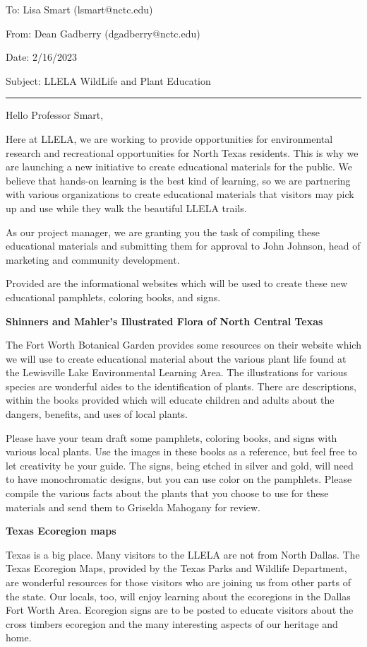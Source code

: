 \documentclass[12pt,a4paper,english]{article}
\begin{document}
\begin{flushleft}

To: Lisa Smart (lsmart@nctc.edu) 

From: Dean Gadberry (dgadberry@nctc.edu)

Date: 2/16/2023

Subject: LLELA WildLife and Plant Education

\hfill \break
\rule{\textwidth}{0.01em} %
\hfill \break
Hello Professor Smart,

Here at LLELA, we are working to provide opportunities for environmental research and recreational opportunities for North Texas residents.
This is why we are launching a new initiative to create educational materials for the public. We believe that hands-on learning is the best kind of learning, so we are partnering with various organizations to create educational materials that visitors may pick up and use while they walk the beautiful LLELA trails. 

As our project manager, we are granting you the task of compiling these educational materials and submitting them for approval to John Johnson, head of marketing and community development. 

Provided are the informational websites which will be used to create these new educational pamphlets, coloring books, and signs. 

\hfill \break
\textbf{Shinners and Mahler's Illustrated Flora of North Central Texas}
\par
The Fort Worth Botanical Garden provides some resources on their website which we will use to create educational material about the various plant life found at the Lewisville Lake Environmental Learning Area.
The illustrations for various species are wonderful aides to the identification of plants. There are descriptions, within the books provided which will educate children and adults about the dangers, benefits, and uses of local plants. 

Please have your team draft some pamphlets, coloring books, and signs with various local plants. Use the images in these books as a reference, but feel free to let creativity be your guide. The signs, being etched in silver and gold, will need to have monochromatic designs, but you can use color on the pamphlets. Please compile the various facts about the plants that you choose to use for these materials and send them to Griselda Mahogany for review.

\hfill\break
\textbf{Texas Ecoregion maps}
\par
Texas is a big place. Many visitors to the LLELA are not from North Dallas. The Texas Ecoregion Maps, provided by the Texas Parks and Wildlife Department, are wonderful resources for those visitors who are joining us from other parts of the state. 
Our locals, too, will enjoy learning about the ecoregions in the Dallas Fort Worth Area. Ecoregion signs are to be posted to educate visitors about the cross timbers ecoregion and the many interesting aspects of our heritage and home.


\end{flushleft}
\end{document}

